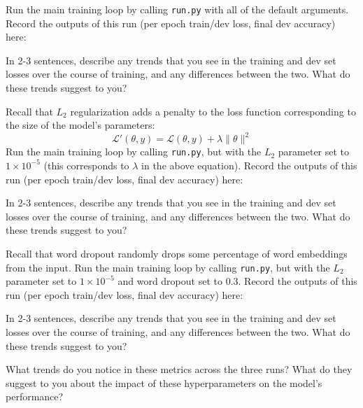 \documentclass[11pt]{article}
\begin{document}
\vspace{2em}
 Run the main training loop by calling \texttt{run.py} with all of the default arguments.  Record the outputs of this run (per epoch train/dev loss, final dev accuracy) here:

\vspace{4em}

\noindent In 2-3 sentences, describe any trends that you see in the training and dev set losses over the course of training, and any differences between the two.  What do these trends suggest to you?


\vspace{2em}
 Recall that $L_2$ regularization adds a penalty to the loss function corresponding to the size of the model's parameters:
\[ \mathcal{L}'(\theta, y) = \mathcal{L}(\theta, y) + \lambda \|\theta\|^2 \]
Run the main training loop by calling \texttt{run.py}, but with the $L_2$ parameter set to $1\times10^{-5}$ (this corresponds to $\lambda$ in the above equation).  Record the outputs of this run (per epoch train/dev loss, final dev accuracy) here:

\vspace{4em}

\noindent In 2-3 sentences, describe any trends that you see in the training and dev set losses over the course of training, and any differences between the two.  What do these trends suggest to you?


\vspace{2em}
 Recall that word dropout randomly drops some percentage of word embeddings from the input.
Run the main training loop by calling \texttt{run.py}, but with the $L_2$ parameter set to $1\times10^{-5}$ and word dropout set to $0.3$.  Record the outputs of this run (per epoch train/dev loss, final dev accuracy) here:

\vspace{4em}

\noindent In 2-3 sentences, describe any trends that you see in the training and dev set losses over the course of training, and any differences between the two.  What do these trends suggest to you?


\vspace{2em}
 What trends do you notice in these metrics across the three runs?  What do they suggest to you about the impact of these hyperparameters on the model's performance?
\end{document}
